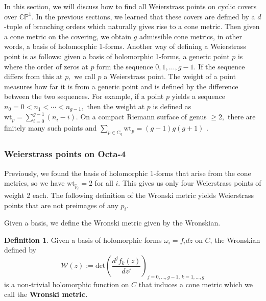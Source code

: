 \documentclass[12pt,reqno]{amsart}
\DeclareMathOperator{\Aut}{Aut}
\newtheorem*{proposition}{Proposition}
\theoremstyle{definition}
\newtheorem{defn}{Definition}
\theoremstyle{remark}
\begin{document}
In this section, we will discuss how to find all Weierstrass points on cyclic covers over $\mathbb{C}\mathbb{P}^1.$ In the previous sections, we learned that these covers are defined by a $d$-tuple of branching orders which naturally gives rise to a cone metric. Then given a cone metric on the covering, we obtain $g$ admissible cone metrics, in other words, a basis of holomorphic 1-forms. Another way of defining a Weierstrass point is as follows: given a basis of holomorphic 1-forms, a generic point $p$ is where the order of zeros at $p$ form the sequence $0, 1, \ldots , g - 1.$ If the sequence differs from this at $p,$ we call $p$ a Weierstrass point. The weight of a point measures how far it is from a generic point and is defined by the difference between the two sequences. For example, if a point $p$ yields a sequence $n_0 = 0 < n_1 < \cdots < n_{g-1},$ then the weight at $p$ is defined as $\textrm{wt}_p = \sum\limits_{i=0}^{g-1} (n_i - i).$ On a compact Riemann surface of genus $\geq 2,$ there are finitely many such points and $\sum\limits_{p \in C_g} \textrm{wt}_p = (g - 1) g (g + 1)$ \cite{fk}. 



\subsubsection*{Weierstrass points on Octa-4} Previously, we found the basis of holomorphic 1-forms that arise from the cone metrics, so we have $\textrm{wt}_{\widetilde{p_i}} = 2$ for all $i.$ This gives us only four Weierstrass points of weight 2 each. The following definition of the Wronski metric yields Weierstrass points that are not preimages of any $p_i.$

Given a basis, we define the Wronski metric given by the Wronskian.

\begin{defn}\label{def: wronski} Given a basis of holomorphic forms $\omega_i = f_i d z$ on $C$, the Wronskian defined by $$\mathcal{W}(z) := \textrm{det} \left( \frac{d^j f_k(z)}{d z^j} \right)_{j = 0, \ldots , g - 1, \, k = 1, \ldots , g}$$ is a non-trivial holomorphic function on $C$ that induces a cone metric which we call the \textbf{Wronski metric.} \end{defn}
\end{document}
